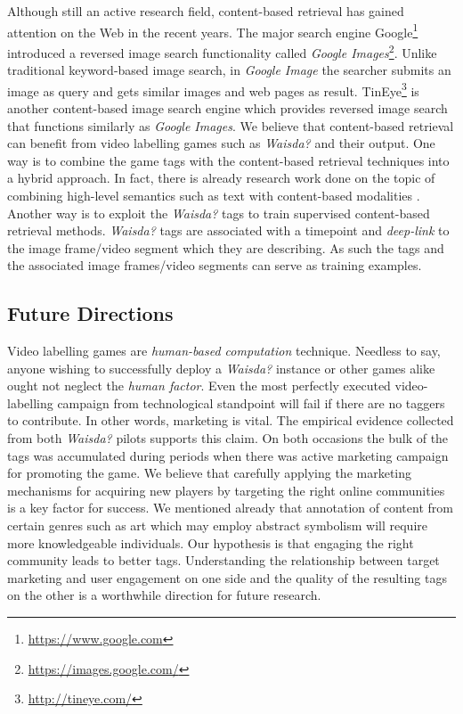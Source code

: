 Although still an active research field, content-based retrieval has gained attention on the Web in the recent years. The major search engine Google\footnote{\url{https://www.google.com}} introduced a reversed image search functionality called \textit{Google Images}\footnote{\url{https://images.google.com/}}. Unlike traditional keyword-based image search, in \textit{Google Image} the searcher submits an image as query and gets similar images and web pages as result. TinEye\footnote{\url{http://tineye.com/}} is another content-based image search engine which provides reversed image search that functions similarly as \textit{Google Images}. We believe that content-based retrieval can benefit from video labelling games such as \textit{Waisda?} and their output. One way is to combine the game tags with the content-based retrieval techniques into a hybrid approach. In fact, there is already research work done on the topic of combining high-level semantics such as text with content-based modalities \cite{Popescu:2007:ODC:1282280.1282338,Yavlinsky06alarge,citeulike:4000618,Huurnink:2010:TTR:1816041.1816045,snoek2007adding}.
Another way is to exploit the \textit{Waisda?} tags to train supervised content-based retrieval methods. \textit{Waisda?} tags are associated with a timepoint and \textit{deep-link} to the image frame/video segment which they are describing. As such the tags and the associated image frames/video segments can serve as training examples.

\subsection{Future Directions}
Video labelling games are \textit{human-based computation} technique. Needless to say, anyone wishing to successfully deploy a \textit{Waisda?} instance or other games alike ought not neglect the \textit{human factor}. Even the most perfectly executed video-labelling campaign from technological standpoint will fail if there are no taggers to contribute. In other words, marketing is vital. The empirical evidence collected from both \textit{Waisda?} pilots supports this claim. On both occasions the bulk of the tags was accumulated during periods when there was active marketing campaign for promoting the game. We believe that carefully applying the marketing mechanisms for acquiring new players by targeting the right online communities is a key factor for success. We mentioned already that annotation of content from certain genres such as art which may employ abstract symbolism will require more knowledgeable individuals. Our hypothesis is that engaging the right community leads to better tags. Understanding the relationship between target marketing and user engagement on one side and the quality of the resulting tags on the other is a worthwhile direction for future research.

